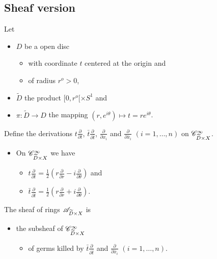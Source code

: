\subsection{Sheaf version}
\def\myincl{\textcolor{green!40!black}{i}}
\def\mymnf{\textcolor{blue!40!black}{]-\epsilon,r^o[\times S^1\times X}}
\def\mysheaf{\textcolor{yellow!60!black}{\sC_{\mymnf}^\infty}}
\def\mypbsheaf{\myincl^{-1}\mysheaf}

Let
\begin{itemize}
  \item $D$ be a open disc
    \begin{itemize}
      \item with coordinate $t$ centered at the origin and
      \item of radius $r^o>0$,
    \end{itemize}
  \item $\tilde D$ the product $[0,r^o[\times S^1$ and
  \item $\pi: \tilde D\to D$ the mapping
    $(r,e^{i\theta})\mapsto t=re^{i\theta}$.
\end{itemize}
Define the derivations
$t\frac{\partial}{\partial t}$, $\bar t\frac{\partial}{\partial\bar t}$,
$\frac{\partial}{\partial x_i}$ and $\frac{\partial}{\partial\bar x_i}$
$(i=1,\dots,n)$ on $\mathscr{C}_{\widetilde D\times X}^\infty$.
\begin{itemize}
  \item On $\mathscr{C}_{\widetilde D\times X}^\infty$ we have
    \begin{itemize}
      \item $t\frac{\partial}{\partial t}=
              \frac{1}{2}\left(r\frac{\partial}{\partial r}
              -i\frac{\partial}{\partial\theta} \right)$ and
      \item $\bar t\frac{\partial}{\partial\bar t}=
              \frac{1}{2}\left(r\frac{\partial}{\partial r}
              +i\frac{\partial}{\partial\theta} \right)$.
    \end{itemize}
\end{itemize}
\begin{defn}[II.5.10]
  The sheaf of rings $\mathscr{A}_{\widetilde D\times X}$ is
  \begin{itemize}
    \item the subsheaf of $\mathscr{C}_{\widetilde D\times X}^\infty$
      \begin{itemize}
        \item of germs killed by $\bar t\frac{\partial}{\partial\bar t}$ and
          $\frac{\partial}{\partial\bar x_i}$ $(i=1,\dots,n)$.
      \end{itemize}
  \end{itemize}
\end{defn}
